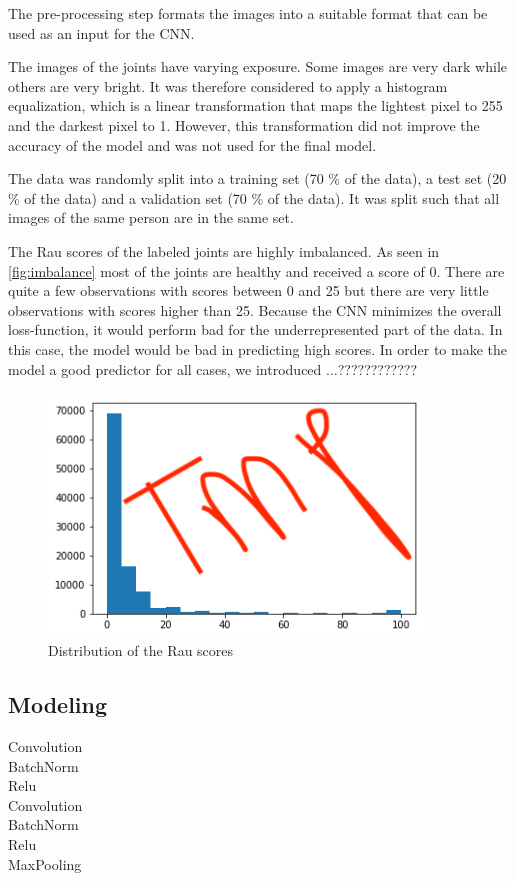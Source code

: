 \documentclass[12pt]{article}
\begin{document}
The pre-processing step formats the images into a suitable format that can be used as an input for the CNN. 

The images of the joints have varying exposure. Some images are very dark while others are very bright. It was therefore considered to apply a histogram equalization, which is a linear transformation that maps the lightest pixel to 255 and the darkest pixel to 1. However, this transformation did not improve the accuracy of the model and was not used for the final model.

The data was randomly split into a training set (70 \% of the data), a test set (20 \% of the data) and a validation set (70 \% of the data). It was split such that all images of the same person are in the same set.

The Rau scores of the labeled joints are highly imbalanced. As seen in \autoref{fig:imbalance} most of the joints are healthy and received a score of 0. There are quite a few observations with scores between 0 and 25 but there are very little observations with scores higher than 25. Because the CNN minimizes the overall loss-function, it would perform bad for the underrepresented part of the data. In this case, the model would be bad in predicting high scores. In order to make the model a good predictor for all cases, we introduced ...????????????

\begin{figure}[ht]
\includegraphics[width=10cm]{imbalance}	
\caption{Distribution of the Rau scores}
\label{fig:imbalance}
\end{figure}

\subsection{Modeling}

Convolution\\
BatchNorm\\
Relu\\
Convolution\\
BatchNorm\\
Relu\\
MaxPooling\\
\end{document}
